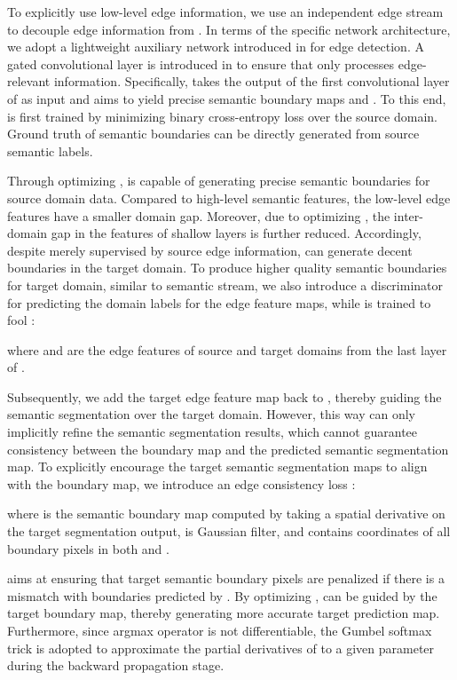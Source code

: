 \documentclass[sigconf]{acmart}
\begin{document}
\par To explicitly use low-level edge information, we use an independent edge stream  to decouple edge information from . In terms of the specific network architecture, we adopt a lightweight auxiliary network introduced in \cite{takikawa2019gated} for edge detection. A gated convolutional layer is introduced in  to ensure that  only processes edge-relevant information. Specifically,  takes the output of the first convolutional layer of  as input and aims to yield precise semantic boundary maps  and . To this end,  is first trained by minimizing binary cross-entropy loss  over the source domain. Ground truth of semantic boundaries can be directly generated from source semantic labels.  

\par Through optimizing ,  is capable of generating precise semantic boundaries for source domain data. Compared to high-level semantic features, the low-level edge features have a smaller domain gap. Moreover, due to optimizing , the inter-domain gap in the features of shallow layers is further reduced. Accordingly, despite merely supervised by source edge information,  can generate decent boundaries in the target domain. To produce higher quality semantic boundaries for target domain, similar to semantic stream, we also introduce a discriminator  for predicting the domain labels for the edge feature maps, while  is trained to fool :

where  and  are the edge features of source and target domains from the last layer of . 

\par Subsequently, we add the target edge feature map back to , thereby guiding the semantic segmentation over the target domain. However, this way can only implicitly refine the semantic segmentation results, which cannot guarantee consistency between the boundary map and the predicted semantic segmentation map. To explicitly encourage the target semantic segmentation maps to align with the boundary map, we introduce an edge consistency loss :

where  is the semantic boundary map computed by taking a spatial derivative on the target segmentation output,  is Gaussian filter, and  contains coordinates of all boundary pixels in both  and . 

\par  aims at ensuring that target semantic boundary pixels are penalized if there is a mismatch with boundaries predicted by . By optimizing ,  can be guided by the target boundary map, thereby generating more accurate target prediction map. Furthermore, since argmax operator is not differentiable, the Gumbel softmax trick \cite{jang2016categorical} is adopted to approximate the partial derivatives of  to a given parameter during the backward propagation stage. 
\end{document}
